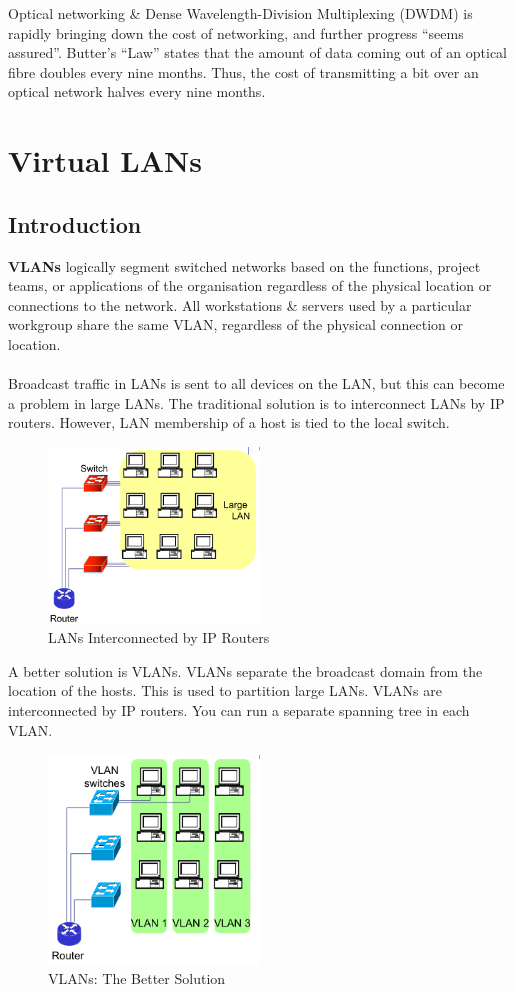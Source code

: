 \documentclass[a4paper,11pt]{article}
\begin{document}
Optical networking \& Dense Wavelength-Division Multiplexing (DWDM) is rapidly bringing down the cost of networking, and 
further progress ``seems assured''.
Butter's ``Law'' states that the amount of data coming out of an optical fibre doubles every nine months. 
Thus, the cost of transmitting a bit over an optical network halves every nine months.

\section{Virtual LANs}
\subsection{Introduction}
\textbf{VLANs} logically segment switched networks based on the functions, project teams, or applications of the organisation 
regardless of the physical location or connections to the network. 
All workstations \& servers used by a particular workgroup share the same VLAN, regardless of the physical connection or location. 
\\\\ 
Broadcast traffic in LANs is sent to all devices on the LAN, but this can become a problem in large LANs. 
The traditional solution is to interconnect LANs by IP routers.
However, LAN membership of a host is tied to the local switch. 
\begin{figure}[H]
    \centering
    \includegraphics[width=0.5\textwidth]{./images/interconnected_lans.png}
    \caption{LANs Interconnected by IP Routers}
\end{figure}
A better solution is VLANs. 
VLANs separate the broadcast domain from the location of the hosts. 
This is used to partition large LANs.
VLANs are interconnected by IP routers. 
You can run a separate spanning tree in each VLAN.
\begin{figure}[H]
    \centering
    \includegraphics[width=0.5\textwidth]{./images/vlan.png}
    \caption{VLANs: The Better Solution}
\end{figure}
\end{document}
